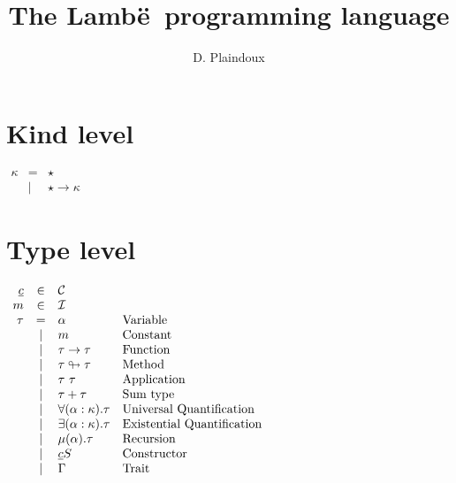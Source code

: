 \documentclass{article}[11pt]
\newcommand{\lambe}[0]{{\sf Lamb\"e~}}
\begin{document}
    \title{The \lambe programming language}
    \author{D. Plaindoux}

    \maketitle


    \section{Kind level}\label{sec:kind-level}

    \begin{math}
        \begin{array}{rcll}
            \kappa
            & =    & \star                    \\
            & \mid & \star \rightarrow \kappa
        \end{array}
    \end{math}


    \section{Type level}\label{sec:type-level}

    \begin{math}
        \begin{array}{rclp{5cm}}
            \underline{c} & \in & {\cal C} \\
            m & \in & {\cal I} \\
            \tau & =
            & \alpha & Variable \\
            & \mid & m                            & Constant                   \\
            & \mid & \tau \rightarrow \tau        & Function                   \\
            & \mid & \tau \looparrowright \tau    & Method                     \\
            & \mid & \tau~\tau                    & Application                \\
            & \mid & \tau + \tau                  & Sum~type                   \\
            & \mid & \forall (\alpha:\kappa).\tau & Universal~Quantification   \\
            & \mid & \exists (\alpha:\kappa).\tau & Existential~Quantification \\
            & \mid & \mu(\alpha).\tau             & Recursion                  \\
            & \mid & \underline{c} S              & Constructor                \\
            & \mid & \Gamma                       & Trait                      \\
        \end{array}
    \end{math}
\end{document}
